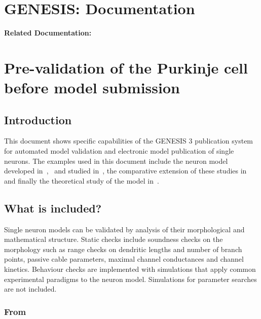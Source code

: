 \documentclass[12pt]{article}
\begin{document}
\section*{GENESIS: Documentation}

{\bf Related Documentation:}

\section*{Pre-validation of the Purkinje cell before model submission}

\subsection*{Introduction}

This document shows specific capabilities of the GENESIS 3 publication
system for automated model validation and electronic model publication
of single neurons.  The examples used in this document include the
neuron model developed in~\cite{De-Schutter-E:1994vn},~\cite{E:1994hc}
and studied in~\cite{schutter94:_simul_purkin}, the comparative
extension of these studies
in~\cite{bower09:_compar_evolut_comput_analy_cereb} and finally the
theoretical study of the model in~\cite{coop09:_using_purkin}.

\subsection*{What is included?}

Single neuron models can be validated by analysis of their
morphological and mathematical structure.  Static checks include
soundness checks on the morphology such as range checks on dendritic
lengths and number of branch points, passive cable parameters, maximal
channel conductances and channel kinetics.  Behaviour checks are
implemented with simulations that apply common experimental paradigms
to the neuron model.  Simulations for parameter searches are not
included.


\subsubsection*{From~\cite{De-Schutter-E:1994vn}}
\end{document}
